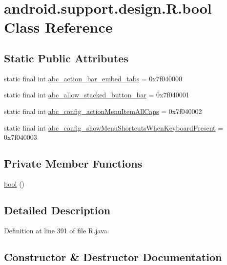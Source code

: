 \hypertarget{classandroid_1_1support_1_1design_1_1_r_1_1bool}{}\section{android.\+support.\+design.\+R.\+bool Class Reference}
\label{classandroid_1_1support_1_1design_1_1_r_1_1bool}
\subsection*{Static Public Attributes}
\begin{DoxyCompactItemize}
\item 
static final int \mbox{\hyperlink{classandroid_1_1support_1_1design_1_1_r_1_1bool_a12b8abdc03b45f744e5cd022a682e181}{abc\+\_\+action\+\_\+bar\+\_\+embed\+\_\+tabs}} = 0x7f040000
\item 
static final int \mbox{\hyperlink{classandroid_1_1support_1_1design_1_1_r_1_1bool_a2a8dac5f8c4ccac5b125012665593d60}{abc\+\_\+allow\+\_\+stacked\+\_\+button\+\_\+bar}} = 0x7f040001
\item 
static final int \mbox{\hyperlink{classandroid_1_1support_1_1design_1_1_r_1_1bool_a4877609fc5e66b66c02146bb21a07830}{abc\+\_\+config\+\_\+action\+Menu\+Item\+All\+Caps}} = 0x7f040002
\item 
static final int \mbox{\hyperlink{classandroid_1_1support_1_1design_1_1_r_1_1bool_a4042d6c58489ca07bb71f1b08b2e75bc}{abc\+\_\+config\+\_\+show\+Menu\+Shortcuts\+When\+Keyboard\+Present}} = 0x7f040003
\end{DoxyCompactItemize}
\subsection*{Private Member Functions}
\begin{DoxyCompactItemize}
\item 
\mbox{\hyperlink{classandroid_1_1support_1_1design_1_1_r_1_1bool_ab26e13111a4cc45f7ada3003f8cf7506}{bool}} ()
\end{DoxyCompactItemize}


\subsection{Detailed Description}


Definition at line 391 of file R.\+java.



\subsection{Constructor \& Destructor Documentation}
\mbox{\label{classandroid_1_1support_1_1design_1_1_r_1_1bool_ab26e13111a4cc45f7ada3003f8cf7506}} 
